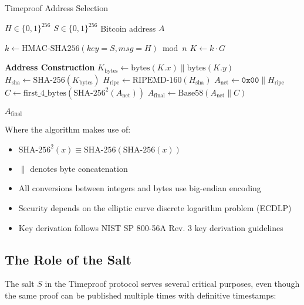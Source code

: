 \documentclass[12pt]{report}
\begin{document}
\begin{algorithm}
\caption{Timeproof Address Selection}
\label{alg:address}
\begin{algorithmic}[1]
    \Require $H \in \{0,1\}^{256}$ 
    \Require $S \in \{0,1\}^{256}$ 
    \Ensure Bitcoin address $A$
    
    \State $k \gets \text{HMAC-SHA256}(key=S, msg=H) \bmod n$ 
    \State $K \gets k \cdot G$ 
    
    \State \textbf{Address Construction}
    \State $K_{\text{bytes}} \gets \text{bytes}(K.x) \parallel \text{bytes}(K.y)$
    \State $H_{\text{sha}} \gets \text{SHA-256}(K_{\text{bytes}})$
    \State $H_{\text{ripe}} \gets \text{RIPEMD-160}(H_{\text{sha}})$
    \State $A_{\text{net}} \gets \mathtt{0x00} \parallel H_{\text{ripe}}$
    \State $C \gets \text{first\_4\_bytes}(\text{SHA-256}^2(A_{\text{net}}))$
    \State $A_{\text{final}} \gets \text{Base58}(A_{\text{net}} \parallel C)$
    
    \State \Return $A_{\text{final}}$
\EndProcedure
\end{algorithmic}
\end{algorithm}

Where the algorithm makes use of:
\begin{itemize}
    \item $\text{SHA-256}^2(x) \equiv \text{SHA-256}(\text{SHA-256}(x))$
    \item $\parallel$ denotes byte concatenation
    \item All conversions between integers and bytes use big-endian encoding
    \item Security depends on the elliptic curve discrete logarithm problem (ECDLP) \cite{BlakeSeroussiSmart1999}
    \item Key derivation follows NIST SP 800-56A Rev. 3 key derivation guidelines
\end{itemize}

\clearpage  %

\subsection{The Role of the Salt}

The salt \( S \) in the Timeproof protocol serves several critical purposes, even though the same proof can be published multiple times with definitive timestamps:
\end{document}
